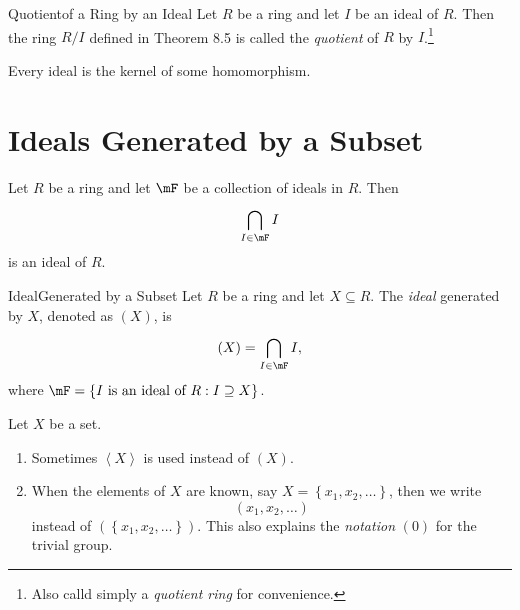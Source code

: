 \documentclass[pmath347]{subfiles}
\begin{document}
    \begin{definition}{Quotient}{of a Ring by an Ideal}
        Let $R$ be a ring and let $I$ be an ideal of $R$. Then the ring $R /I$ defined in Theorem 8.5 is called the \emph{quotient} of $R$ by $I$.\footnote{Also calld simply a \emph{quotient ring} for convenience.}
    \end{definition}
    
    \begin{cor}{}
        Every ideal is the kernel of some homomorphism.
    \end{cor}	

    \section{Ideals Generated by a Subset}
    
    \begin{prop}{}
        Let $R$ be a ring and let $\mF$ be a collection of ideals in $R$. Then
        \begin{equation*}
            \bigcap^{}_{I\in\mF} I
        \end{equation*}
        is an ideal of $R$.
    \end{prop}

    \begin{definition}{Ideal}{Generated by a Subset}
        Let $R$ be a ring and let $X\subseteq R$. The \emph{ideal} generated by $X$, denoted as $\left( X \right)$, is
        \begin{equation*}
            \left( X \right) = \bigcap^{}_{I\in\mF} I,
        \end{equation*}
        where $\mF = \left\lbrace I\text{ is an ideal of }R:I\supseteq X \right\rbrace $.
    \end{definition}

    \np Let $X$ be a set.
    \begin{enumerate}
        \item Sometimes $\left< X \right>$ is used instead of $\left( X \right)$.
        \item When the elements of $X$ are known, say $X = \left\lbrace x_1,x_2,\ldots \right\rbrace$, then we write
            \begin{equation*}
                \left( x_1,x_2,\ldots \right) 
            \end{equation*}
            instead of $\left( \left\lbrace x_1,x_2,\ldots \right\rbrace  \right)$. This also explains the \textit{notation} $\left( 0 \right)$ for the trivial group.
    \end{enumerate}
    
\end{document}
